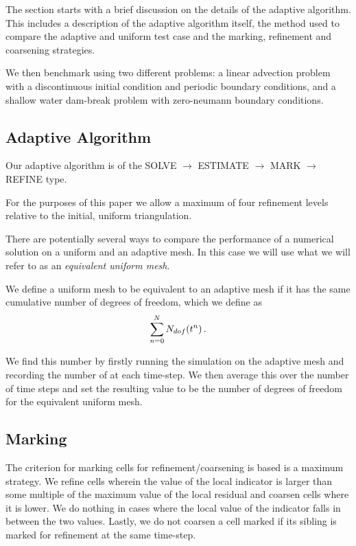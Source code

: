 \documentclass[final]{amsart}
\numberwithin{equation}{section}
\begin{document}
The section starts with a brief discussion on the details of the adaptive algorithm.  This includes a description of the adaptive algorithm itself,  the method used  to compare the adaptive and uniform test case and the  marking,  refinement and coarsening strategies.

We then  benchmark using  two different problems: a linear advection problem with a discontinuous initial condition and periodic boundary conditions, and a shallow water dam-break problem with zero-neumann boundary conditions. 

\subsection{Adaptive Algorithm}
Our adaptive algorithm is of the  SOLVE $\to$ ESTIMATE $\to$ MARK $\to$ REFINE type.

\begin{Rem}
For the purposes of this paper we allow a maximum of  four  refinement levels relative to the initial, uniform triangulation. 
\end{Rem}
There are potentially several ways to compare the performance of a numerical solution on a uniform and an adaptive mesh.  In this case we will use what we will refer to as an \textit{equivalent uniform mesh}.
\begin{Defn}  \label{defn:equiv_uniform_mesh} We define a uniform mesh to be equivalent to an adaptive mesh if it has the same cumulative number of degrees of freedom, which we define as
	\begin{equation}
\sum_{n=0}^{N}N_{dof}\!\left({t^n}\right).
	\end{equation}
\end{Defn}
 We find this number by firstly running the simulation on the adaptive mesh and recording the number of  at each time-step.  We then average this over the number of time steps and set the resulting value to be the number of degrees of freedom for the equivalent uniform mesh.

\subsection{Marking}
The criterion for marking cells for refinement/coarsening is based is a maximum strategy.  We refine cells wherein  the value of the local indicator is larger than some multiple of the maximum value of the local residual and coarsen cells where it is lower.  We  do nothing in cases where the local value of the indicator falls in between the two values.  Lastly, we do not coarsen a cell marked if its sibling is marked for   refinement at the same time-step.
\end{document}
